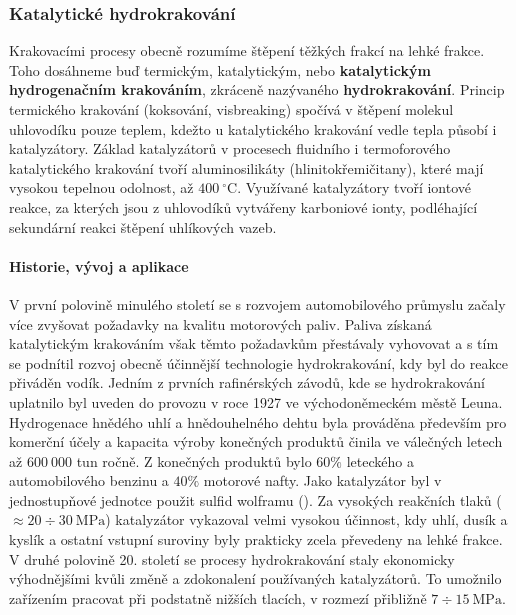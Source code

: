 \subsubsection{Katalytické hydrokrakování}

Krakovacími procesy obecně rozumíme štěpení těžkých frakcí na lehké frakce. Toho dosáhneme buď termickým, katalytickým, nebo \textbf{katalytickým hydrogenačním krakováním}, zkráceně nazývaného \textbf{hydrokrakování}. Princip termického krakování (koksování, visbreaking) spočívá v štěpení molekul uhlovodíku pouze teplem, kdežto u katalytického krakování vedle tepla působí i katalyzátory. Základ katalyzátorů v procesech fluidního i termoforového katalytického krakování tvoří aluminosilikáty (hlinitokřemičitany), které mají vysokou tepelnou odolnost, až $400\ \mathrm{^{\circ}C}$. \cite{Blazek2006} Využívané katalyzátory tvoří iontové reakce, za kterých jsou z uhlovodíků vytvářeny karboniové ionty, podléhající sekundární reakci štěpení uhlíkových vazeb. \cite{Bartovska2016}

\paragraph{Historie, vývoj a aplikace}
V první polovině minulého století se s rozvojem automobilového průmyslu začaly více zvyšovat požadavky na kvalitu motorových paliv. Paliva získaná katalytickým krakováním však těmto požadavkům přestávaly vyhovovat a s tím se podnítil rozvoj obecně účinnější  technologie hydrokrakování, kdy byl do reakce přiváděn vodík. Jedním z prvních rafinérských závodů, kde se hydrokrakování uplatnilo byl uveden do provozu v roce 1927 ve východoněmeckém městě Leuna. \cite{Speight2020} Hydrogenace hnědého uhlí a hnědouhelného dehtu byla prováděna především pro komerční účely a kapacita výroby konečných produktů činila ve válečných letech až $600\ 000$ tun ročně. Z konečných produktů bylo $60\%$ leteckého a automobilového benzinu a $40\%$ motorové nafty. \cite{Holroyd1945} Jako katalyzátor byl v jednostupňové jednotce použit sulfid wolframu (). Za vysokých reakčních tlaků ($\approx 20 \div 30\ \mathrm{MPa}$) katalyzátor vykazoval velmi vysokou účinnost, kdy uhlí, dusík a kyslík a ostatní vstupní suroviny byly prakticky zcela převedeny na lehké frakce. V druhé polovině 20. století se procesy hydrokrakování staly ekonomicky výhodnějšími kvůli změně a zdokonalení používaných katalyzátorů. To umožnilo zařízením pracovat při podstatně nižších tlacích, v rozmezí přibližně $7 \div 15\ \mathrm{MPa}$. \cite{Speight2020}

